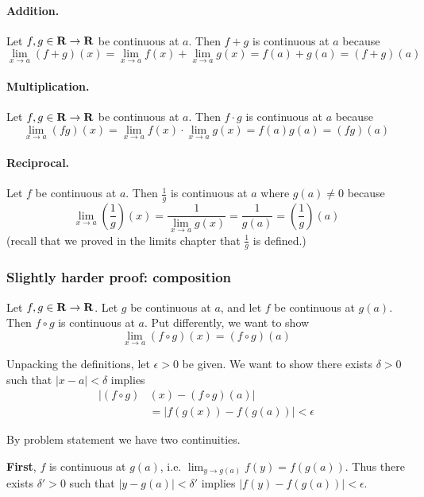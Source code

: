 \vs

\paragraph{Addition.} Let $f,g\in\mathbf{R}\to\mathbf{R}$ be continuous at $a$. Then
$f+g$ is continuous at $a$ because
\[\lim_{x\to a}(f+g)(x)=\lim_{x\to a}f(x)+\lim_{x\to a}g(x)=f(a)+g(a)=(f+g)(a)\]

\paragraph{Multiplication.} Let $f,g\in\mathbf{R}\to\mathbf{R}$ be continuous at $a$. Then
$f\cdot g$ is continuous at $a$ because
\[\lim_{x\to a}(fg)(x)=\lim_{x\to a}f(x)\cdot\lim_{x\to a}g(x)=f(a)g(a)=(fg)(a)\]

\paragraph{Reciprocal.} Let $f$ be continuous at $a$. Then $\frac{1}{g}$
is continuous at $a$ where $g(a)\neq 0$ because
\[\lim_{x\to a}\left(\frac{1}{g}\right)(x)=\frac{1}{\lim_{x\to a}g(x)}=\frac{1}{g(a)}=\left(\frac{1}{g}\right)(a)\]
(recall that we proved in the limits chapter that $\frac{1}{g}$ is defined.)

\subsubsection*{Slightly harder proof: composition}

Let $f,g\in\mathbf{R}\to\mathbf{R}$. Let $g$ be continuous at $a$, and let $f$ be
continuous at $g(a)$. Then $f\circ g$ is continuous at $a$. Put
differently, we want to show
\[\lim_{x\to a}(f\circ g)(x)=(f\circ g)(a)\]

Unpacking the definitions, let $\epsilon>0$ be given. We want to show there
exists $\delta>0$ such that $|x-a|<\delta$ implies
\begin{align*}
    |(f\circ g)&(x)-(f\circ g)(a)|\\
    &=|f(g(x))-f(g(a))|<\epsilon
\end{align*}

By problem statement we have two continuities.

\vs

\textbf{First}, $f$ is continuous at $g(a)$, i.e.
$\lim_{y\to g(a)}f(y)=f(g(a))$. Thus there exists $\delta'>0$ such that
$|y-g(a)|<\delta'$ implies $|f(y)-f(g(a))|<\epsilon$.

\vs

